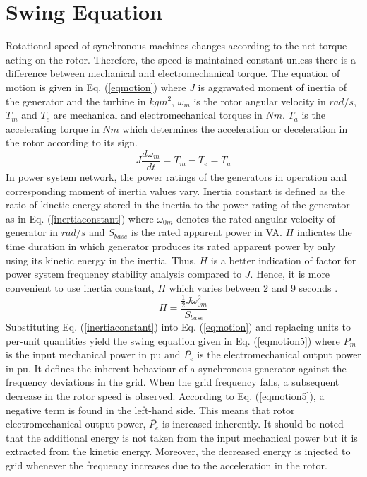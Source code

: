 \section{Swing Equation}
\label{swing}
Rotational speed of synchronous machines changes according to the net torque acting on the rotor. Therefore, the speed is maintained constant unless there is a difference between mechanical and electromechanical torque. The equation of motion is given in Eq. (\ref{eqmotion}) where $J$ is aggravated moment of inertia of the generator and the turbine in $kgm^{2}$, $\omega_{m}$ is the rotor angular velocity in $rad/s$, $T_{m}$ and $T_{e}$ are mechanical and electromechanical torques in $Nm$. $T_{a}$ is the accelerating torque in $Nm$ which determines the acceleration or deceleration in the rotor according to its sign.
\begin{equation}
J\frac{d\omega_{m}}{dt}=T_{m}-T_{e}=T_{a}
\label{eqmotion}
\end{equation}
In power system network, the power ratings of the generators in operation and corresponding moment of inertia values vary. Inertia constant is defined as the ratio of kinetic energy stored in the inertia to the power rating of the generator as in Eq. (\ref{inertiaconstant}) where $\omega_{0m}$ denotes the rated angular velocity of generator in $rad/s$ and $S_{base}$ is the rated apparent power in VA. $H$ indicates the time duration in which generator produces its rated apparent power by only using its kinetic energy in the inertia. Thus, $H$ is a better indication of factor for power system frequency stability analysis compared to $J$. Hence, it is more convenient to use inertia constant, $H$ which varies between 2 and 9 seconds \cite{Kundur}.
\begin{equation}
H=\frac{{\frac{1}{2}}J\omega_{0m}^{2}}{S_{base}}
\label{inertiaconstant}
\end{equation}
Substituting Eq. (\ref{inertiaconstant}) into Eq. (\ref{eqmotion}) and replacing units to per-unit quantities yield the swing equation given in Eq. (\ref{eqmotion5}) where $\overline{P_{m}}$ is the input mechanical power in pu and $\overline{P_{e}}$ is the electromechanical output power in pu. It defines the inherent behaviour of a synchronous generator against the frequency deviations in the grid. When the grid frequency falls, a subsequent decrease in the rotor speed is observed. According to Eq. (\ref{eqmotion5}), a negative term is found in the left-hand side. This means that rotor electromechanical output power, $\overline{P_{e}}$ is increased inherently. It should be noted that the additional energy is not taken from the input mechanical power but it is extracted from the kinetic energy. Moreover, the decreased energy is injected to grid whenever the frequency increases due to the acceleration in the rotor.
